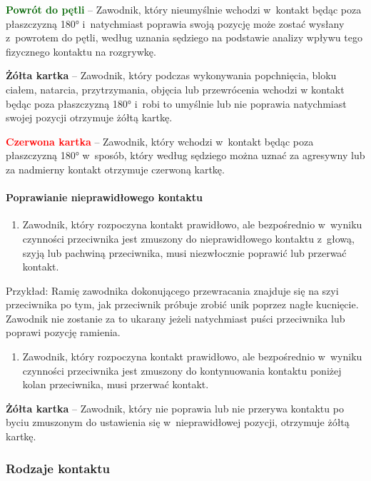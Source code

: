 \documentclass[12pt,a4paper]{article}
\newcommand\redcard[1]{\bgroup\textcolor{red}{\textbf{#1}}}
\newcommand\yellowcard[1]{\bgroup\textcolor{darkyellow}{\textbf{#1}}}
\newcommand\other[1]{\bgroup\textcolor{darkgreen}{\textbf{#1}}}
\begin{document}
\other{Powrót do pętli} -- Zawodnik, który nieumyślnie wchodzi w~kontakt będąc poza płaszczyzną 180° i~natychmiast poprawia swoją pozycję może
zostać wysłany z~powrotem do pętli, według uznania sędziego na podstawie
analizy wpływu tego fizycznego kontaktu na rozgrywkę.

\yellowcard{Żółta kartka} -- Zawodnik, który podczas wykonywania popchnięcia,
bloku ciałem, natarcia, przytrzymania, objęcia lub przewrócenia wchodzi
w kontakt będąc poza płaszczyzną 180° i~robi to umyślnie lub nie poprawia
natychmiast swojej pozycji otrzymuje żółtą kartkę.

\redcard{Czerwona kartka} -- Zawodnik, który wchodzi w~kontakt będąc poza płaszczyzną 180° w~sposób, który według sędziego można uznać za
agresywny lub za nadmierny kontakt otrzymuje czerwoną kartkę.

\paragraph{Poprawianie nieprawidłowego kontaktu}

\begin{enumerate}
	\item
	      Zawodnik, który rozpoczyna kontakt prawidłowo, ale bezpośrednio w~wyniku czynności przeciwnika jest zmuszony do nieprawidłowego kontaktu
	      z~głową, szyją lub pachwiną przeciwnika, musi niezwłocznie poprawić
	      lub przerwać kontakt.
\end{enumerate}

Przykład: Ramię zawodnika dokonującego przewracania
znajduje się na szyi przeciwnika po tym, jak przeciwnik próbuje zrobić
unik poprzez nagłe kucnięcie. Zawodnik nie zostanie za to ukarany jeżeli
natychmiast puści przeciwnika lub poprawi pozycję ramienia.

\begin{enumerate}[resume]
	\item
	      Zawodnik, który rozpoczyna kontakt prawidłowo, ale bezpośrednio w~wyniku czynności przeciwnika jest zmuszony do kontynuowania kontaktu
	      poniżej kolan przeciwnika, musi przerwać kontakt.
\end{enumerate}

\yellowcard{Żółta kartka} -- Zawodnik, który nie poprawia lub nie przerywa
kontaktu po byciu zmuszonym do ustawienia się w~nieprawidłowej pozycji,
otrzymuje żółtą kartkę.

\subsubsection{Rodzaje kontaktu}
\end{document}
